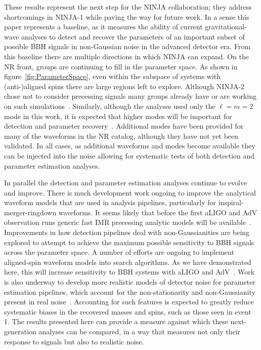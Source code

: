 These results represent the next step for the NINJA collaboration;
they address shortcomings in NINJA-1 while paving the way
for future work.  In a sense this paper represents a baseline, as it
measures the ability of current gravitational-wave analyses to detect
and recover the parameters of an important subset of possible BBH
signals in non-Gaussian noise in the advanced detector era. 
From this baseline there are
multiple directions in which NINJA can expand. On the NR front,
groups are continuing to fill in the parameter space.  As shown in
figure~\ref{fig:ParameterSpace}, even within the subspace of systems
with (anti-)aligned spins there are large regions left to explore.
Although NINJA-2 chose not to consider precessing signals many groups
already have or are working on such simulations~\cite{
Campanelli:2008nk, Tichy:2007hk, Tichy:2008du,Schmidt:2010it,
O'Shaughnessy:2011fx,Mroue:2012kv,O'Shaughnessy:2012vm,
O'Shaughnessy:2012ay,Hinder:2013oqa,Taracchini:2013rva}. Similarly, although 
the analyses used only the
$\ell=m=2$ mode in this work, it is expected that higher modes will be
important for detection and parameter
recovery~\cite{Pekowsky:2012sr,Healy:2013jza,McWilliams:2010eq,Brown:2012nn,
Pan:2011gk}.  Additional modes have been provided for many of
the waveforms in the NR catalog, although they have not yet been
validated.  In all cases, as additional waveforms and modes become
available they can be injected into the noise allowing for systematic
tests of both detection and parameter estimation analyses.

In parallel the detection and parameter estimation analyses continue to 
evolve and improve. There is much development work ongoing to improve the 
analytical waveform models that are used in analysis pipelines, particularly 
for inspiral-merger-ringdown waveforms. It seems likely that before the 
first aLIGO and AdV observation runs generic fast IMR precessing analytic 
models will be 
available~\cite{Santamaria:2010yb,Taracchini:2012ig,Pan:2013rra,Hannam:2013oca,
Taracchini:2013rva}.
Improvements in how detection pipelines deal with non-Gaussianities are being 
explored to attempt to achieve the maximum possible sensitivity to BBH signals 
across the parameter space. A number of efforts are ongoing to implement 
aligned-spin waveform models into  search algorithms. As we have demonstrated 
here, this will increase sensitivity to BBH systems with aLIGO and 
AdV~\cite{Brown:2012qf,Ajith:2012mn,Harry:2013tca}.
Work is also underway to develop more realistic models 
of detector noise for parameter estimation pipelines, which account for the 
non-stationarity and non-Gaussianity present in real 
noise~\cite{Littenberg:2013gja}.  Accounting for such features
is expected to greatly reduce systematic biases in the recovered masses and 
spins, such as those seen in event 1.
The results presented here can provide a measure against which these
next-generation analyses can be compared, in a way that measures not only their
response to signals but also to realistic noise.

